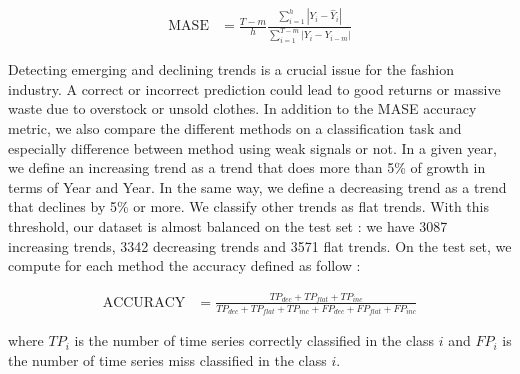 \documentclass{article} %
\newcommand{\lag}{h}
\begin{document}
\begin{align*}
\mathrm{MASE} &= \frac{T-m}{h}\frac{\sum_{i=1}^h |Y_i - \hat{Y}_i| }{\sum_{i=1}^{T-m} |Y_i - Y_{i-m}|}
\end{align*}


%

Detecting emerging and declining trends is a crucial issue for the fashion industry. A correct or incorrect prediction could lead to good returns or massive waste due to overstock or unsold clothes. In addition to the MASE accuracy metric, we also compare the different methods on a classification task and especially difference between method using weak signals or not. In a given year, we define an increasing trend as a trend that does more than 5\% of growth in terms of Year and Year. In the same way, we define a decreasing trend as a trend that declines by 5\% or more. We classify other trends as flat trends. With this threshold, our dataset is almost balanced on the test set : we have 3087 increasing trends, 3342 decreasing trends and 3571 flat trends. On the test set, we compute for each method the accuracy defined as follow :

\begin{align*}
\mathrm{ACCURACY} &= \frac{TP_{dec} + TP_{flat} + TP_{inc}}{TP_{dec} + TP_{flat} + TP_{inc} + FP_{dec} + FP_{flat} + FP_{inc}}
\end{align*}

where $TP_i$ is the number of time series correctly classified in the class $i$ and $FP_i$ is the number of time series miss classified in the class $i$.

\end{document}
